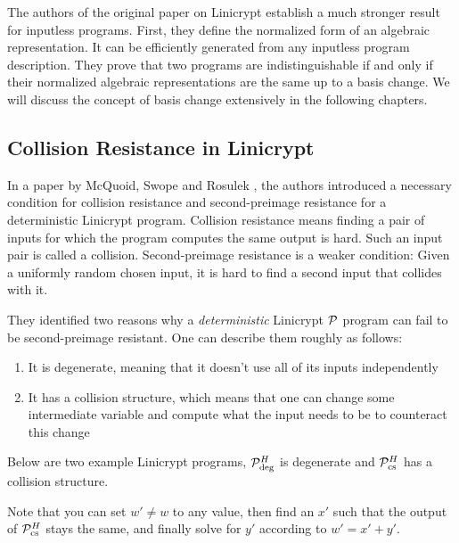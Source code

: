 The authors of the original paper on Linicrypt \cite{C:CarRos16} establish a much stronger result for inputless programs.
First, they define the normalized form of an algebraic representation.
It can be efficiently generated from any inputless program description.
They prove that two programs are indistinguishable if and only if their normalized algebraic representations are the same up to a basis change.
We will discuss the concept of basis change extensively in the following chapters.

\subsection{Collision Resistance in Linicrypt}

In a paper by McQuoid, Swope and Rosulek
\cite[Characterizing Collision and Second-Preimage Resistance in Linicrypt]{TCC:McQSwoRos19},
the authors introduced a necessary condition for collision resistance
and second-preimage resistance for a deterministic Linicrypt program.
Collision resistance means finding a pair of inputs for which the program computes the same output is hard.
Such an input pair is called a collision.
Second-preimage resistance is a weaker condition:
Given a uniformly random chosen input,
it is hard to find a second input that collides with it. 

They identified two reasons why a \textit{deterministic} Linicrypt $\P$ program can fail to be second-preimage resistant.
One can describe them roughly as follows:
\begin{enumerate}
  \item It is degenerate, meaning that it doesn't use all of its inputs independently
  \item It has a collision structure,
    which means that one can change some intermediate variable and compute what the input needs to be to counteract this change
\end{enumerate}

Below are two example Linicrypt programs, $\P^\H_\textrm{deg}$ is degenerate and $\P^\H_\textrm{cs}$ has a collision structure.
\begin{pchstack}[center,space=2cm]
\end{pchstack}
Note that you can set $w' \neq w$ to any value,
then find an $x'$ such that the output of $\P^\H_{\textrm{cs}}$ stays the same,
and finally solve for $y'$ according to $w' = x' + y'$.

